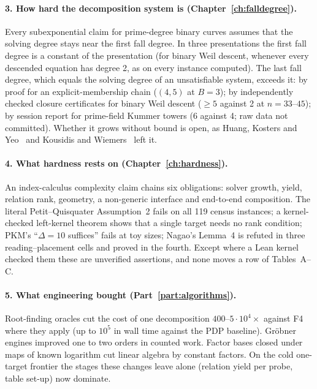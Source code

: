 \paragraph{3. How hard the decomposition system is
(Chapter~\ref{ch:falldegree}).} Every subexponential claim for
prime-degree binary curves assumes that the solving degree stays near the
first fall degree. In three presentations the first fall degree is a
constant of the presentation (for binary Weil descent, whenever every
descended equation has degree 2, as on every instance computed). The last
fall degree, which equals the solving degree of an unsatisfiable system,
exceeds it: by proof for an explicit-membership chain ($(4,5)$ at $B=3$);
by independently checked closure certificates for binary Weil descent
($\ge5$ against 2 at $n=33$--$45$); by session report for prime-field
Kummer towers (6 against 4; raw data not committed). Whether it grows
without bound is open, as Huang, Kosters and Yeo~\cite{hky2015} and
Kousidis and Wiemers~\cite{kousidis2019} left it.

\paragraph{4. What hardness rests on (Chapter~\ref{ch:hardness}).} An
index-calculus complexity claim chains six obligations: solver growth,
yield, relation rank, geometry, a non-generic interface and end-to-end
composition. The literal Petit--Quisquater Assumption~2 fails on all 119
census instances; a kernel-checked left-kernel theorem shows that a single
target needs no rank condition; PKM's ``$\Delta=10$ suffices'' fails at toy
sizes; Nagao's Lemma~4 is refuted in three reading--placement cells and
proved in the fourth. Except where a Lean kernel checked them these are
unverified assertions, and none moves a row of Tables~A--C.

\paragraph{5. What engineering bought (Part~\ref{part:algorithms}).}
Root-finding oracles cut the cost of one decomposition $400$--$5\cdot10^4
\times$ against F4 where they apply (up to $10^5$ in wall time against the
PDP baseline). Gr\"obner engines improved one to two orders in counted
work. Factor bases closed under maps of known logarithm cut linear algebra
by constant factors. On the cold one-target frontier the stages these
changes leave alone (relation yield per probe, table set-up) now dominate.

